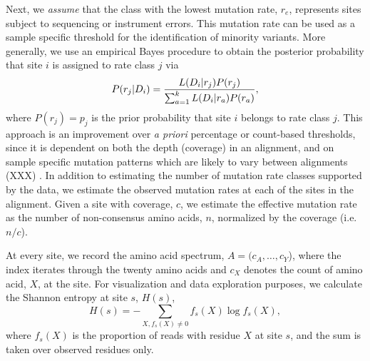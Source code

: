 \documentclass[10pt]{article}
\begin{document}
Next, we \textit{assume} that the class with the lowest mutation rate, $r_{e}$, represents sites subject to sequencing or instrument errors.
This mutation rate can be used as a sample specific threshold for the identification of minority variants.
More generally, we use an empirical Bayes procedure to obtain the posterior probability that site $i$ is assigned to rate class $j$ via
\begin{equation}
P(r_{j}|D_{i}) = {L(D_{i}|r_{j}) P(r_{j}) \over { \sum_{a=1}^{k} L(D_{i}|r_{a}) } P(r_{a})},
\end{equation}
where $P(r_{j}) = p_{j}$ is the prior probability that site $i$ belongs to rate class $j$.
This approach is an improvement over \textit{a priori} percentage or count-based thresholds,
since it is dependent on both the depth (coverage) in an alignment,
and on sample specific mutation patterns which are likely to vary between alignments (XXX) \cite{}.
In addition to estimating the number of mutation rate classes supported by the data,
we estimate the observed mutation rates at each of the sites in the alignment.
Given a site with coverage, $c$, we estimate the effective mutation rate
as the number of non-consensus amino acids, $n$, normalized by the coverage (i.e. $n / c$).

At every site, we record the amino acid spectrum, $A = (c_{A}, \ldots, c_{Y}$),
where the index iterates through the twenty amino acids and $c_{X}$ denotes the count of amino acid, $X$, at the site.
For visualization and data exploration purposes, we calculate the Shannon entropy at site $s$, $H(s)$,
\[H (s) = -\sum_{X, f_{s}(X)\ne 0} f_s(X) \log {f_{s}(X)},\] where $f_s(X)$ is the proportion of reads with residue $X$ at site $s$,
and the sum is taken over observed residues only.
\end{document}
